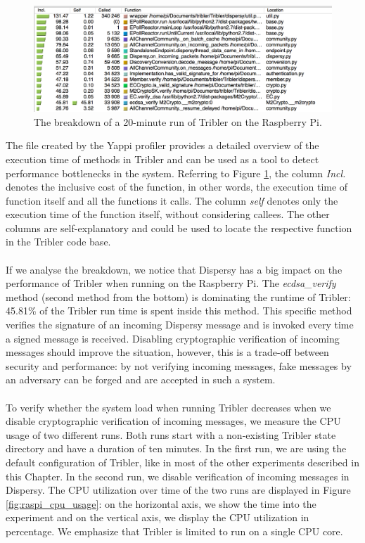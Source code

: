 \begin{figure}[!h]
	\centering
	\includegraphics[width=1.0\columnwidth]{images/experiments/yappi_breakdown}
	\caption{The breakdown of a 20-minute run of Tribler on the Raspberry Pi.}
	\label{fig:yappi_breakdown}
\end{figure}

The file created by the Yappi profiler provides a detailed overview of the execution time of methods in Tribler and can be used as a tool to detect performance bottlenecks in the system. Referring to Figure \ref{fig:yappi_breakdown}, the column \emph{Incl.} denotes the inclusive cost of the function, in other words, the execution time of function itself and all the functions it calls. The column \emph{self} denotes only the execution time of the function itself, without considering callees. The other columns are self-explanatory and could be used to locate the respective function in the Tribler code base.\\\\
If we analyse the breakdown, we notice that Dispersy has a big impact on the performance of Tribler when running on the Raspberry Pi. The \emph{ecdsa\_verify} method (second method from the bottom) is dominating the runtime of Tribler: 45.81\% of the Tribler run time is spent inside this method. This specific method verifies the signature of an incoming Dispersy message and is invoked every time a signed message is received. Disabling cryptographic verification of incoming messages should improve the situation, however, this is a trade-off between security and performance: by not verifying incoming messages, fake messages by an adversary can be forged and are accepted in such a system.\\\\
To verify whether the system load when running Tribler decreases when we disable cryptographic verification of incoming messages, we measure the CPU usage of two different runs. Both runs start with a non-existing Tribler state directory and have a duration of ten minutes. In the first run, we are using the default configuration of Tribler, like in most of the other experiments described in this Chapter. In the second run, we disable verification of incoming messages in Dispersy. The CPU utilization over time of the two runs are displayed in Figure \ref{fig:raspi_cpu_usage}: on the horizontal axis, we show the time into the experiment and on the vertical axis, we display the CPU utilization in percentage. We emphasize that Tribler is limited to run on a single CPU core.\\\\

